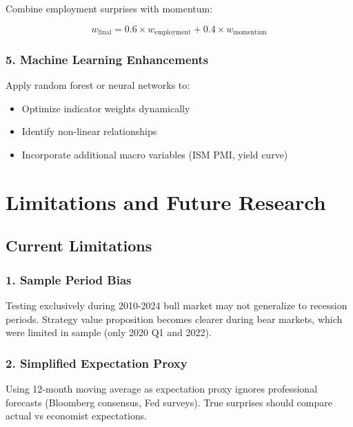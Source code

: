 \documentclass[12pt,a4paper]{article}
\begin{document}
Combine employment surprises with momentum:

\begin{equation}
w_{\text{final}} = 0.6 \times w_{\text{employment}} + 0.4 \times w_{\text{momentum}}
\end{equation}

\subsubsection{5. Machine Learning Enhancements}

Apply random forest or neural networks to:
\begin{itemize}
    \item Optimize indicator weights dynamically
    \item Identify non-linear relationships
    \item Incorporate additional macro variables (ISM PMI, yield curve)
\end{itemize}

\newpage
\section{Limitations and Future Research}

\subsection{Current Limitations}

\subsubsection{1. Sample Period Bias}

Testing exclusively during 2010-2024 bull market may not generalize to recession periods. Strategy value proposition becomes clearer during bear markets, which were limited in sample (only 2020 Q1 and 2022).

\subsubsection{2. Simplified Expectation Proxy}

Using 12-month moving average as expectation proxy ignores professional forecasts (Bloomberg consensus, Fed surveys). True surprises should compare actual vs economist expectations.
\end{document}
